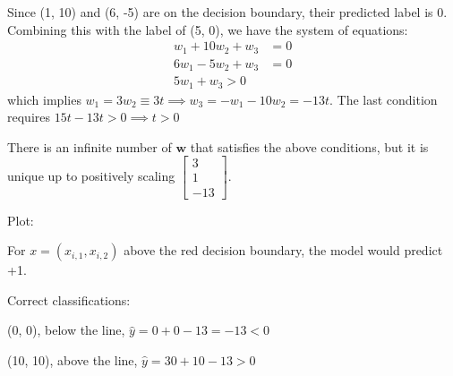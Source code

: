 \documentclass[a4paper, 12pt]{article}
\begin{document}
\begin{problem}
\end{problem}
\begin{solution}
    Since (1, 10) and (6, -5) are on the decision boundary, their predicted label is 0. Combining this with the label of (5, 0), we have the system of equations:
    \begin{align*}
        w_1 + 10 w_2 + w_3 & = 0 \\
        6 w_1 - 5w_2 + w_3 & = 0 \\
        5 w_1 + w_3 > 0
    \end{align*}
    which implies $w_1 = 3w_2 \equiv 3t \implies w_3 = -w_1 - 10w_2 = -13t$. The last condition requires $15t - 13t > 0 \implies t > 0$

    There is an infinite number of $\mathbf{w}$ that satisfies the above conditions, but it is unique up to positively scaling $\begin{bmatrix}
            3 \\
            1 \\
            -13
        \end{bmatrix}$.

    Plot:
    \begin{center}
    \end{center}

    For $x = (x_{i, 1}, x_{i, 2})$ above the red decision boundary, the model would predict +1.

    Correct classifications:

    (0, 0), below the line, $\hat{y} = 0 + 0 - 13  = -13 < 0$

    (10, 10), above the line, $\hat{y} = 30 + 10 - 13 > 0$

\end{solution}
\end{document}

